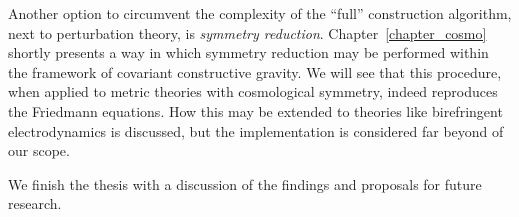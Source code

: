 Another option to circumvent the complexity of the ``full'' construction algorithm, next to perturbation theory, is \emph{symmetry reduction}. Chapter~\ref{chapter_cosmo} shortly presents a way in which symmetry reduction may be performed within the framework of covariant constructive gravity. We will see that this procedure, when applied to metric theories with cosmological symmetry, indeed reproduces the Friedmann equations. How this may be extended to theories like birefringent electrodynamics is discussed, but the implementation is considered far beyond of our scope.

We finish the thesis with a discussion of the findings and proposals for future research.

